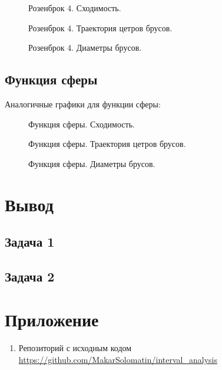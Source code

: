 \documentclass[14pt,a4paper,article]{ncc}
\begin{document}
    \begin{figure}[H]
        \caption{Розенброк 4. Сходимость.}
        \label{fig:image}
    \end{figure}
    \begin{figure}[H]
        \caption{Розенброк 4. Траектория цетров брусов.}
        \label{fig:image}
    \end{figure}  
    \begin{figure}[H]
        \caption{Розенброк 4. Диаметры брусов.}
        \label{fig:image}
    \end{figure} 
\subsection{Функция сферы}
Аналогичные графики для функции сферы:
    \begin{figure}[H]
        \caption{Функция сферы. Сходимость.}
        \label{fig:image}
    \end{figure}
    \begin{figure}[H]
        \caption{Функция сферы. Траектория цетров брусов.}
        \label{fig:image}
    \end{figure}  
    \begin{figure}[H]
        \caption{Функция сферы. Диаметры брусов.}
        \label{fig:image}
    \end{figure} 

\section{Вывод}
\subsection{Задача 1}
\subsection{Задача 2}

\section{Приложение}
\begin{enumerate}
    \item Репозиторий с исходным кодом \\ \url{https://github.com/MakarSolomatin/interval_analysis}
\end{enumerate}
\end{document}
